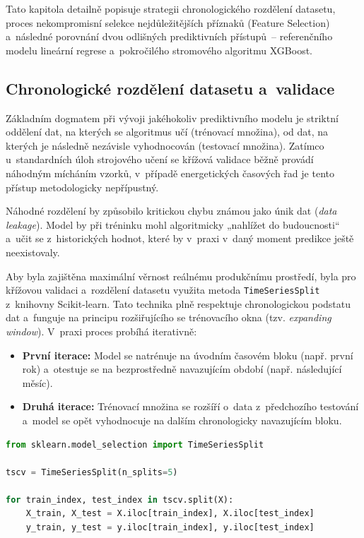 \documentclass[a4paper]{article}
\begin{document}
Tato kapitola detailně popisuje strategii chronologického rozdělení datasetu, proces nekompromisní selekce nejdůležitějších příznaků (Feature Selection) a~následné porovnání dvou odlišných prediktivních přístupů~-- referenčního modelu lineární regrese a~pokročilého stromového algoritmu XGBoost.

\subsection{Chronologické rozdělení datasetu a~validace}
Základním dogmatem při vývoji jakéhokoliv prediktivního modelu je striktní oddělení dat, na kterých se algoritmus učí (trénovací množina), od dat, na kterých je následně nezávisle vyhodnocován (testovací množina). Zatímco u~standardních úloh strojového učení se křížová validace běžně provádí náhodným mícháním vzorků, v~případě energetických časových řad je tento přístup metodologicky nepřípustný.

Náhodné rozdělení by způsobilo kritickou chybu známou jako únik dat (\textit{data leakage}). Model by při tréninku mohl algoritmicky „nahlížet do budoucnosti“ a~učit se z~historických hodnot, které by v~praxi v~daný moment predikce ještě neexistovaly.

Aby byla zajištěna maximální věrnost reálnému produkčnímu prostředí, byla pro křížovou validaci a~rozdělení datasetu využita metoda \texttt{TimeSeriesSplit}~\cite{time-series-split} z~knihovny Scikit-learn. Tato technika plně respektuje chronologickou podstatu dat a~funguje na principu rozšiřujícího se trénovacího okna (tzv. \textit{expanding window}).
V~praxi proces probíhá iterativně:
\begin{itemize}
    \item \textbf{První iterace:} Model se natrénuje na úvodním časovém bloku (např. první rok) a~otestuje se na bezprostředně navazujícím období (např. následující měsíc).
    \item \textbf{Druhá iterace:} Trénovací množina se rozšíří o~data z~předchozího testování a~model se opět vyhodnocuje na dalším chronologicky navazujícím bloku.
\end{itemize}

\begin{lstlisting}[language=Python, caption={Chronologické rozdělení časové řady pomocí TimeSeriesSplit zamezující úniku dat}]
from sklearn.model_selection import TimeSeriesSplit

tscv = TimeSeriesSplit(n_splits=5)

for train_index, test_index in tscv.split(X):
    X_train, X_test = X.iloc[train_index], X.iloc[test_index]
    y_train, y_test = y.iloc[train_index], y.iloc[test_index]
    
\end{lstlisting}
\end{document}
